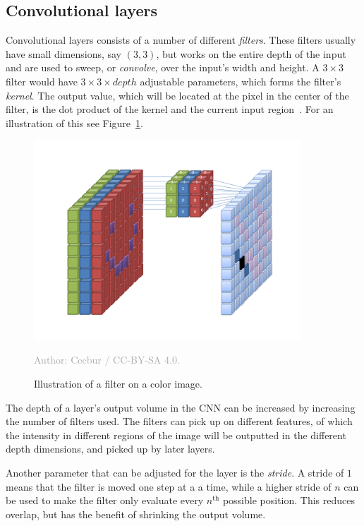 \documentclass{kththesis}
\newcommand{\source}[1]{\vspace{-5mm}\caption*{\textcolor{darkgray}{Author: {#1}}\vspace{-7mm}} }
\begin{document}
\subsection{Convolutional layers}
Convolutional layers consists of a number of different \textit{filters}. These filters usually have small dimensions, say $(3, 3)$, but works on the entire depth of the input and are used to sweep, or \textit{convolve}, over the input's width and height. A $3 \times 3$ filter would have $3 \times 3 \times depth$ adjustable parameters, which forms the filter's \textit{kernel}. The output value, which will be located at the pixel in the center of the filter, is the dot product of the kernel and the current input region~\cite{cnnIntro}. For an illustration of this see Figure~\ref{fig:cnn_color_filter}.

\begin{figure}
  \begin{center}
    \includegraphics[width=100mm]{img/cnn_color_filter.png}
    \caption{Illustration of a filter on a color image.}
    \source{Cecbur / CC-BY-SA 4.0.}
    \label{fig:cnn_color_filter}
  \end{center}
\end{figure}

The depth of a layer's output volume in the CNN can be increased by increasing the number of filters used. The filters can pick up on different features, of which the intensity in different regions of the image will be outputted in the different depth dimensions, and picked up by later layers.

Another parameter that can be adjusted for the layer is the \textit{stride}. A stride of $1$ means that the filter is moved one step at a a time, while a higher stride of $n$ can be used to make the filter only evaluate every $n^{\text{th}}$ possible position. This reduces overlap, but has the benefit of shrinking the output volume.
\end{document}
